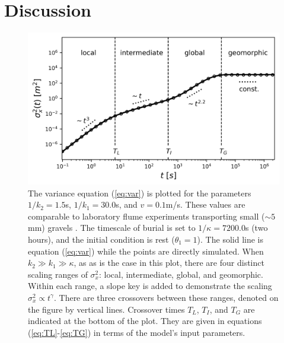 \documentclass[draft,grl]{agujournal2018}
\begin{document}
\section{Discussion}
\label{sec:discussion}
\begin{figure}[t]	
	\includegraphics[width=\linewidth,keepaspectratio]{./figures/diffusion.png}
	\caption{The variance equation (\ref{eq:var}) is plotted for the parameters $1/k_2 = 1.5$s, $1/k_1 = 30.0$s, and $v=0.1$m/s. These values are comparable to laboratory flume experiments transporting small ($\sim 5$mm) gravels \citep[cf.,][]{Lajeunesse2010,Martin2012}. The timescale of burial is set to $1/\kappa = 7200.0$s (two hours), and the initial condition is rest ($\theta_1=1$). The solid line is equation (\ref{eq:var}) while the points are directly simulated. When $k_2\gg k_1 \gg \kappa$, as as is the case in this plot, there are four distinct scaling ranges of $\sigma_x^2$: local, intermediate, global, and geomorphic. Within each range, a slope key is added to demonstrate the scaling $\sigma_x^2 \propto t^\gamma$. There are three crossovers between these ranges, denoted on the figure by vertical lines. Crossover times $T_L$, $T_I$, and $T_G$ are indicated at the bottom of the plot. They are given in equations (\ref{eq:TL}-\ref{eq:TG}) in terms of the model's input parameters. }
	\label{fig:var}
\end{figure}
\end{document}
